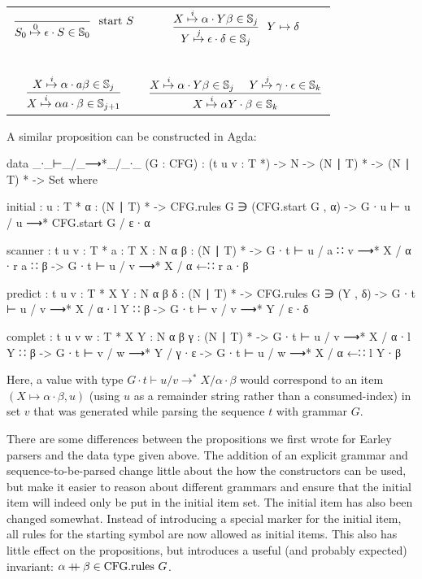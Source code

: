 		\begin{table}[h]
			\centering
			\begin{tabular}{cc}
				\( \displaystyle \frac{}
					{\earley{S_0}{\epsilon}{S}{0} \in \mathbb{S}_0}
					~~\textrm{start } S
					\) &
				\( \displaystyle \frac
					{\earley{X}{\alpha}{Y\beta}{i} \in \mathbb{S}_j}
					{\earley{Y}{\epsilon}{\delta}{j} \in \mathbb{S}_j}
					~~Y \mapsto \delta
					\) 
				\\~&~\\
				\( \displaystyle \frac
					{\earley{X}{\alpha}{a\beta}{i} \in \mathbb{S}_j}
					{\earley{X}{\alpha a}{\beta}{i} \in \mathbb{S}_{j+1}} 
					\) &
				\( \displaystyle \frac
					{
						\earley{X}{\alpha}{Y\beta}{i} \in \mathbb{S}_j~~~~
						\earley{Y}{\gamma}{\epsilon}{j} \in \mathbb{S}_k
						}
					{\earley{X}{\alpha Y}{\beta}{i} \in \mathbb{S}_k} 
					\)
			\end{tabular}
		\end{table}

		A similar proposition can be constructed in Agda:

		\begin{code}
			data _∙_⊢_/_⟶*_/_∙_ (G : CFG) :
			  (t u v : T *) -> N -> (N ∣ T) * -> (N ∣ T) * -> Set where

			  initial : {u : T *} {α : (N ∣ T) *} ->
			    CFG.rules G ∋ (CFG.start G , α) ->
			    G ∙ u ⊢ u / u ⟶* CFG.start G / ε ∙ α

			  scanner : {t u v : T *} {a : T} {X : N} {α β : (N ∣ T) *} ->
			    G ∙ t ⊢ u / a ∷ v ⟶* X / α ∙ r a ∷ β ->
			      G ∙ t ⊢ u / v ⟶* X / α ←∷ r a ∙ β

			  predict : {t u v : T *} {X Y : N} {α β δ : (N ∣ T) *} ->
			    CFG.rules G ∋ (Y , δ) ->
			    G ∙ t ⊢ u / v ⟶* X / α ∙ l Y ∷ β ->
			      G ∙ t ⊢ v / v ⟶* Y / ε ∙ δ

			  complet : {t u v w : T *} {X Y : N} {α β γ : (N ∣ T) *} ->
			    G ∙ t ⊢ u / v ⟶* X / α ∙ l Y ∷ β ->
			    G ∙ t ⊢ v / w ⟶* Y / γ ∙ ε ->
			      G ∙ t ⊢ u / w ⟶* X / α ←∷ l Y ∙ β
		\end{code}

		Here, a value with type $G \cdot t \vdash u / v \rightarrow^* X /
		\alpha \cdot \beta$ would correspond to an item $(X \mapsto \alpha
		\cdot \beta, u)$ (using $u$ as a remainder string rather than a
		consumed-index) in set $v$ that was generated while parsing the
		sequence $t$ with grammar $G$.

		There are some differences between the propositions we first wrote for
		Earley parsers and the data type given above. The addition of an
		explicit grammar and sequence-to-be-parsed change little about the how
		the constructors can be used, but make it easier to reason about
		different grammars and ensure that the initial item will indeed only be
		put in the initial item set. The initial item has also been changed
		somewhat. Instead of introducing a special marker for the initial item,
		all rules for the starting symbol are now allowed as initial items.
		This also has little effect on the propositions, but introduces a
		useful (and probably expected) invariant: $\alpha \concat \beta \in
		\textrm{CFG.rules } G$.

